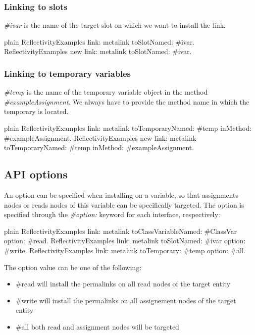 \documentclass[10pt,twoside,english]{_support/latex/sbabook/sbabook}
\begin{document}
\subsubsection{Linking to slots}
\textit{\#ivar} is the name of the target slot on which we want to install the link.

\begin{displaycode}{plain}
ReflectivityExamples link: metalink toSlotNamed: #ivar.
ReflectivityExamples new link: metalink toSlotNamed: #ivar.
\end{displaycode}
\subsubsection{Linking to temporary variables}
\textit{\#temp} is the name of the temporary variable object in the method \textit{\#exampleAssignment}. We always have to provide the method name in which the temporary is located.

\begin{displaycode}{plain}
ReflectivityExamples link: metalink toTemporaryNamed: #temp inMethod: #exampleAssignment.
ReflectivityExamples new link: metalink toTemporaryNamed: #temp inMethod: #exampleAssignment.
\end{displaycode}
\subsection{API options}
An option can be specified when installing on a variable, so that assignments nodes or reads nodes of this variable can be specifically targeted.
The option is specified through the \textit{\#option:} keyword for each interface, respectively:

\begin{displaycode}{plain}
ReflectivityExamples link: metalink toClassVariableNamed: #ClassVar option: #read.
ReflectivityExamples link: metalink toSlotNamed: #ivar option: #write.
ReflectivityExamples link: metalink toTemporary: #temp option: #all.
\end{displaycode}

The option value can be one of the following:

\begin{itemize}
\item \#read will install the permalinks on all read nodes of the target entity
\item \#write will install the permalinks on all assignement nodes of the target entity
\item \#all both read and assignment nodes will be targeted
\end{itemize}
\end{document}
